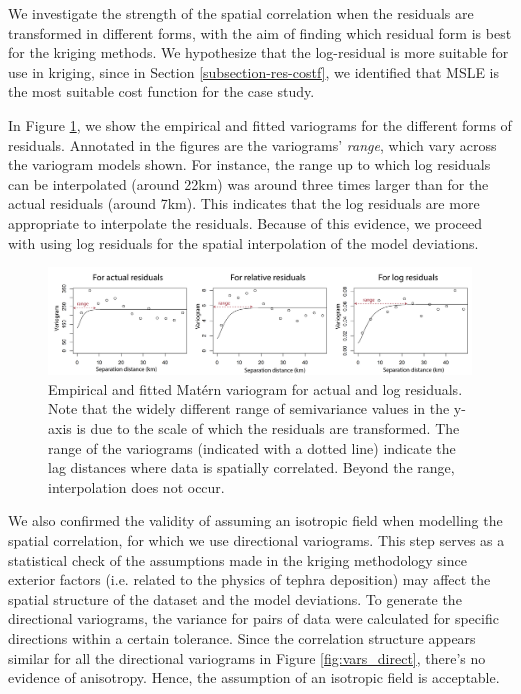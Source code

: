 \documentclass[a4paper,fleqn]{cas-sc}
\begin{document}
    We investigate the strength of the spatial correlation when the residuals are transformed in different forms, with the aim of finding which residual form is best for the kriging methods. We hypothesize that the log-residual is more suitable for use in kriging, since in Section \ref{subsection-res-costf}, we identified that MSLE is the most suitable cost function for the case study. 

    In Figure \ref{fig:vars_three}, we show the empirical and fitted variograms for the different forms of residuals. Annotated in the figures are the variograms' \textit{range}, which vary across the variogram models shown. For instance, the range up to which log residuals can be interpolated (around 22km) was around three times larger than for the actual residuals (around 7km). This indicates that the log residuals are more appropriate to interpolate the residuals. Because of this evidence, we proceed with using log residuals for the spatial interpolation of the model deviations. 

    \begin{figure}[htbp!]
    \centering
    \includegraphics[width=\linewidth]{Figures/fig11_variograms-types.png}
    \caption{Empirical and fitted Mat\'ern variogram for actual and log residuals. Note that the widely different range of semivariance values in the y-axis is due to the scale of which the residuals are transformed. The range of the variograms (indicated with a dotted line) indicate the lag distances where data is spatially correlated. Beyond the range, interpolation does not occur.}
    \label{fig:vars_three}
    \end{figure}
    
    We also confirmed the validity of assuming an isotropic field when modelling the spatial correlation, for which we use directional variograms. This step serves as a statistical check of the assumptions made in the kriging methodology since exterior factors (i.e. related to the physics of tephra deposition) may affect the spatial structure of the dataset and the model deviations. To generate the directional variograms, the variance for pairs of data were calculated for specific directions within a certain tolerance. Since the correlation structure appears similar for all the directional variograms in Figure \ref{fig:vars_direct}, there's no evidence of anisotropy. Hence, the assumption of an isotropic field is acceptable.
    
\end{document}
